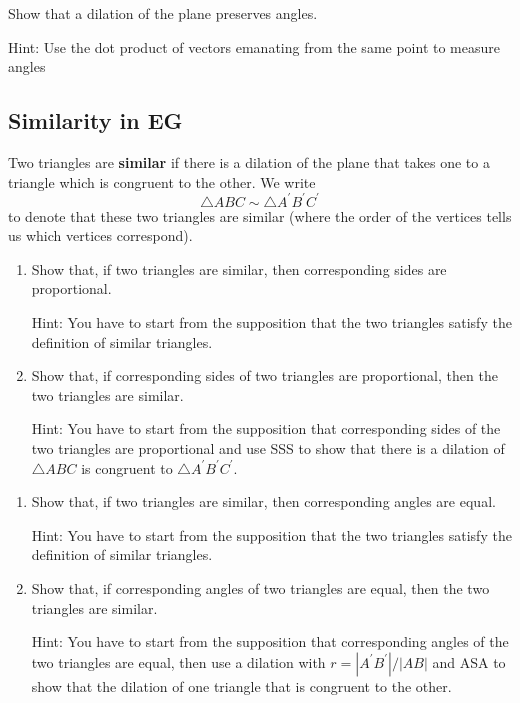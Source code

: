 \begin{question}
Show that a dilation of the plane preserves angles.

Hint: Use the dot product of vectors emanating from the same point to measure
angles
\end{question}

\newpage

\subsection*{Similarity in \textbf{EG}}

\begin{definition}
Two triangles are \textbf{similar} if there is a dilation of the
plane that takes one to a triangle which is congruent to the other. We write%
\[
\triangle ABC\sim\triangle A^{\prime}B^{\prime}C^{\prime}%
\]
to denote that these two triangles are similar (where the order of the
vertices tells us which vertices correspond).
\end{definition}

\begin{question}
\begin{enumerate}
\item Show that, if two triangles are similar, then corresponding
sides are proportional.

Hint: You have to start from the supposition that the two triangles satisfy
the definition of similar triangles.

\item Show that, if corresponding sides of two triangles are proportional, then
the two triangles are similar.

Hint: You have to start from the supposition that corresponding sides of the
two triangles are proportional and use SSS to show that there is a dilation of
$\triangle ABC$ is congruent to $\triangle A^{\prime}B^{\prime}C^{\prime}$.
\end{enumerate}
\end{question}

\begin{question}
\begin{enumerate}
\item Show that, if two triangles are similar, then corresponding
angles are equal.

Hint: You have to start from the supposition that the two triangles satisfy
the definition of similar triangles.

\item Show that, if corresponding angles of two triangles are equal, then the two
triangles are similar.

Hint: You have to start from the supposition that corresponding angles of the
two triangles are equal, then use a dilation with $r=|A^{\prime}B^{\prime
}|/|AB|$ and ASA to show that the dilation of one triangle that is congruent
to the other.
\end{enumerate}
\end{question}

